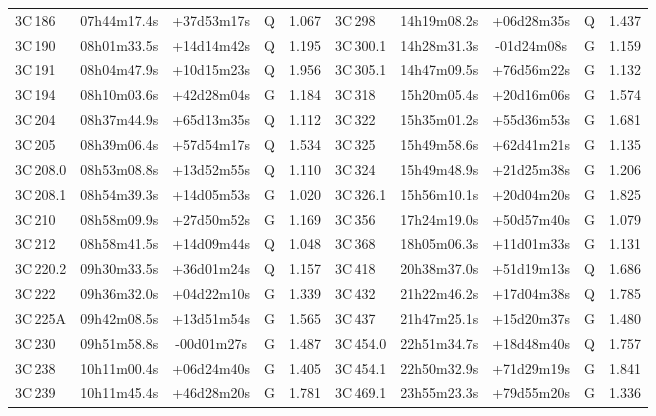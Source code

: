 \documentclass[mathleft,fleqn,%
]{an}
\begin{document}
\begin{table*}
\begin{tabular}{lcccc|lcccc}
 3C\,186      & 07h44m17.4s  & +37d53m17s  &   Q  &   1.067   &   3C\,298      & 14h19m08.2s  & +06d28m35s  &   Q  &   1.437  \\
 3C\,190      & 08h01m33.5s  & +14d14m42s  &   Q  &   1.195   &   3C\,300.1    & 14h28m31.3s  & -01d24m08s  &   G  &   1.159  \\
 3C\,191      & 08h04m47.9s  & +10d15m23s  &   Q  &   1.956   &   3C\,305.1    & 14h47m09.5s  & +76d56m22s  &   G  &   1.132  \\
 3C\,194      & 08h10m03.6s  & +42d28m04s  &   G  &   1.184   &   3C\,318      & 15h20m05.4s  & +20d16m06s  &   G  &   1.574  \\
 3C\,204      & 08h37m44.9s  & +65d13m35s  &   Q  &   1.112   &   3C\,322      & 15h35m01.2s  & +55d36m53s  &   G  &   1.681  \\
 3C\,205      & 08h39m06.4s  & +57d54m17s  &   Q  &   1.534   &   3C\,325      & 15h49m58.6s  & +62d41m21s  &   G  &   1.135  \\
 3C\,208.0    & 08h53m08.8s  & +13d52m55s  &   Q  &   1.110   &   3C\,324      & 15h49m48.9s  & +21d25m38s  &   G  &   1.206  \\
 3C\,208.1    & 08h54m39.3s  & +14d05m53s  &   G  &   1.020   &   3C\,326.1    & 15h56m10.1s  & +20d04m20s  &   G  &   1.825  \\
 3C\,210      & 08h58m09.9s  & +27d50m52s  &   G  &   1.169   &   3C\,356      & 17h24m19.0s  & +50d57m40s  &   G  &   1.079  \\
 3C\,212      & 08h58m41.5s  & +14d09m44s  &   Q  &   1.048   &   3C\,368      & 18h05m06.3s  & +11d01m33s  &   G  &   1.131  \\
 3C\,220.2    & 09h30m33.5s  & +36d01m24s  &   Q  &   1.157   &   3C\,418      & 20h38m37.0s  & +51d19m13s  &   Q  &   1.686  \\
 3C\,222      & 09h36m32.0s  & +04d22m10s  &   G  &   1.339   &   3C\,432      & 21h22m46.2s  & +17d04m38s  &   Q  &   1.785  \\
 3C\,225A     & 09h42m08.5s  & +13d51m54s  &   G  &   1.565   &   3C\,437      & 21h47m25.1s  & +15d20m37s  &   G  &   1.480  \\
 3C\,230      & 09h51m58.8s  & -00d01m27s  &   G  &   1.487   &   3C\,454.0    & 22h51m34.7s  & +18d48m40s  &   Q  &   1.757  \\
 3C\,238      & 10h11m00.4s  & +06d24m40s  &   G  &   1.405   &   3C\,454.1    & 22h50m32.9s  & +71d29m19s  &   G  &   1.841  \\
 3C\,239      & 10h11m45.4s  & +46d28m20s  &   G  &   1.781   &   3C\,469.1    & 23h55m23.3s  & +79d55m20s  &   G  &   1.336  \\

\end{tabular}
\end{table*}
\end{document}
